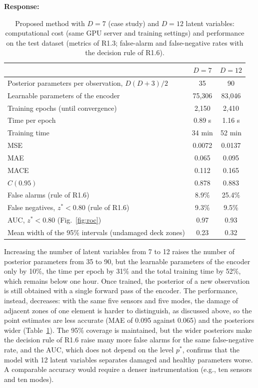 \documentclass[11pt]{article}
\newenvironment{response}{\par\smallskip\noindent\color{resp}\textbf{Response:}\ }{\par}
\begin{document}
\begin{response}
\begin{table}[H]
\centering\small
\caption{Proposed method with $D=7$ (case study) and $D=12$ latent variables: computational cost (same GPU server and
training settings) and performance on the test dataset (metrics of R1.3; false-alarm and false-negative rates with the decision rule of R1.6).}
\label{tab:scal}
\begin{tabular}{lcc}
\toprule
 & $D=7$ & $D=12$ \\
\midrule
Posterior parameters per observation, $D(D+3)/2$ & 35 & 90 \\
Learnable parameters of the encoder & 75,306 & 83,046 \\
Training epochs (until convergence) & 2,150 & 2,410 \\
Time per epoch & 0.89 s & 1.16 s \\
Training time & 34 min & 52 min \\
\midrule
MSE & 0.0072 & 0.0137 \\
MAE & 0.065 & 0.095 \\
MACE & 0.112 & 0.165 \\
$C(0.95)$ & 0.878 & 0.883 \\
False alarms (rule of R1.6) & 8.9\% & 25.4\% \\
False negatives, $z^*<0.80$ (rule of R1.6) & 9.3\% & 9.5\% \\
AUC, $z^*<0.80$ (Fig.~\ref{fig:roc}) & 0.97 & 0.93 \\
Mean width of the 95\% intervals (undamaged deck zones) & 0.23 & 0.32 \\
\bottomrule
\end{tabular}
\end{table}

Increasing the number of latent variables from 7 to 12 raises the number of posterior parameters from 35 to 90, but the
learnable parameters of the encoder only by 10\%, the time per epoch by 31\% and the total training time by 52\%, which
remains below one hour. Once trained, the posterior of a new observation is still obtained with a single forward pass of
the encoder. The performance, instead, decreases: with the same five sensors and five modes, the damage of adjacent
zones of one element is harder to distinguish, as discussed above, so the point estimates are less accurate (MAE of
0.095 against 0.065) and the posteriors wider (Table~\ref{tab:scal}). The 95\% coverage is maintained, but the wider
posteriors make the decision rule of R1.6 raise many more false alarms for the same false-negative rate, and the AUC,
which does not depend on the level $p^*$, confirms that the model with 12 latent variables separates damaged and
healthy parameters worse. A comparable accuracy would require a denser
instrumentation (e.g., ten sensors and ten modes).


\end{response}
\end{document}
